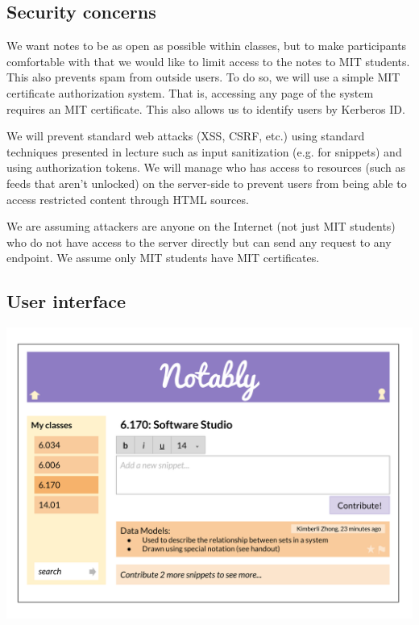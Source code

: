 \documentclass{article}
\begin{document}
\subsection*{Security concerns}

We want notes to be as open as possible within classes, but to make participants comfortable with that we would like to limit access to the notes to MIT students. This also prevents spam from outside users. To do so, we will use a simple MIT certificate authorization system. That is, accessing any page of the system requires an MIT certificate. This also allows us to identify users by Kerberos ID.

We will prevent standard web attacks (XSS, CSRF, etc.) using standard techniques presented in lecture such as input sanitization (e.g. for snippets) and using authorization tokens. We will manage who has access to resources (such as feeds that aren't unlocked) on the server-side to prevent users from being able to access restricted content through HTML sources.

We are assuming attackers are anyone on the Internet (not just MIT students) who do not have access to the server directly but can send any request to any endpoint. We assume only MIT students have MIT certificates.


\subsection*{User interface}

\begin{center}
\includegraphics[width=6in]{UI1.png}
\end{center}
\end{document}
